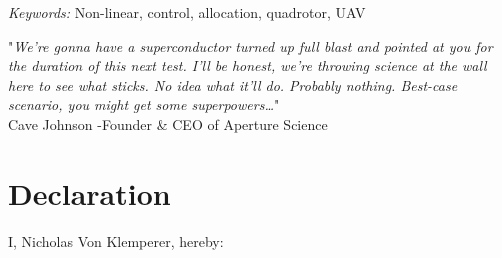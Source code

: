 \documentclass[a4paper, 11pt, oneside, openright, parskip=full]{book}
\newcommand{\auth}{Nicholas Von Klemperer}								%
\newcommand{\key}{Non-linear, control, allocation, quadrotor, UAV}					   %
\begin{document}
\begin{titlepage}
		\vskip 15mm	
	\begin{normalsize}				
		{\itshape Keywords:}
		\key			
	\end{normalsize}	
\end{titlepage}
\afterpage{\null\newpage}
\frontmatter
\begin{center}
\begin{minipage}{0.7\textwidth}
\centering
"\emph{We're gonna have a superconductor turned up full blast and pointed at you for the duration of this next test. I'll be honest, we're throwing science at the wall here to see what sticks. No idea what it'll do. Probably nothing. Best-case scenario, you might get some superpowers\ldots}"
\\
Cave Johnson -Founder \& CEO of Aperture Science
\end{minipage}
\end{center}
\chapter{Declaration}				
\label{ch:decl}
I, \auth,  hereby:
\end{document}

